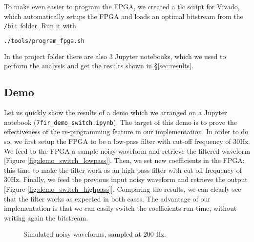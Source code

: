 To make even easier to program the FPGA, we created a tlc script for Vivado, which automatically setups the FPGA and loads an optimal bitstream from the \texttt{/bit} folder. Run it with
\begin{lstlisting}[language=bash]
./tools/program_fpga.sh
\end{lstlisting}

In the project folder there are also 3 Jupyter notebooks, which we used to perform the analysis and get the results shown in §\ref{sec:results}. 






\subsection{Demo}
\label{ssec:switching_demo}

\begin{figure}[H]
    \centering
    
    \qquad
\end{figure}

Let us quickly show the results of a demo which we arranged on a Jupyter notebook (\texttt{7fir\_demo\_switch.ipynb}). The target of this demo is to prove the effectiveness of the re-programming feature in our implementation. In order to do so, we first setup the FPGA to be a low-pass filter with cut-off frequency of 30Hz. We feed to the FPGA a sample noisy waveform and retrieve the filtered waveform [Figure \ref{fig:demo_switch_lowpass}]. Then, we set new coefficients in the FPGA: this time to make the filter work as an high-pass filter with cut-off frequency of 30Hz. Finally, we feed the previous input noisy waveform and retrieve the output [Figure \ref{fig:demo_switch_highpass}]. Comparing the results, we can clearly see that the filter works as expected in both cases. The advantage of our implementation is that we can easily switch the coefficients run-time, without writing again the bitstream.




\begin{figure}[hbt]
    \centering
    \caption{Simulated noisy waveforms, sampled at 200 Hz.}
    \label{fig:sample_general}
    
    
    
    \qquad
\end{figure}


